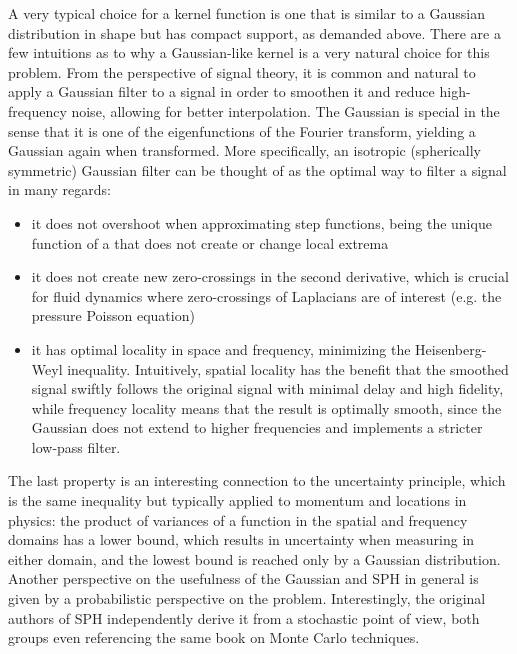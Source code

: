 A very typical choice for a kernel function is one that is similar to a Gaussian distribution in shape but has compact support, as demanded above. There are a few intuitions as to why a Gaussian-like kernel is a very natural choice for this problem. From the perspective of signal theory, it is common\autocite*{gauss-convolution-survey} and natural to apply a Gaussian filter to a signal in order to smoothen it and reduce high-frequency noise, allowing for better interpolation. The Gaussian is special in the sense that it is one of the eigenfunctions of the Fourier transform, yielding a Gaussian again when transformed\autocite*{gauss-eigenfunction}. More specifically, an isotropic (spherically symmetric) Gaussian filter can be thought of as the optimal way to filter a signal in many regards:
\begin{itemize}
  \item it does not overshoot when approximating step functions, being the unique function of a \cite[useful class of functions]{gauss-unique-preserve-local-extrema} that does not create or change local extrema\autocite*{gauss-convolution-survey}
  \item it does not create new zero-crossings in the second derivative\autocite*{gauss-convolution-survey}, which is crucial for fluid dynamics where zero-crossings of Laplacians are of interest (e.g. the pressure Poisson equation)
  \item it has optimal locality in space and frequency, minimizing the Heisenberg-Weyl inequality\autocite*{gauss-convolution-survey}. Intuitively, spatial locality has the benefit that the smoothed signal swiftly follows the original signal with minimal delay and high fidelity, while frequency locality means that the result is optimally smooth, since the Gaussian does not extend to higher frequencies and implements a stricter low-pass filter.
\end{itemize}

The last property is an interesting connection to the uncertainty principle, which is the same inequality but typically applied to momentum and locations in physics: the product of variances of a function in the spatial and frequency domains has a lower bound, which results in uncertainty when measuring in either domain, and the lowest bound is reached only by a Gaussian distribution.\\

Another perspective on the usefulness of the Gaussian and SPH in general is given by a probabilistic perspective on the problem. Interestingly, the original authors of SPH independently derive it from a stochastic point of view\autocite*{sph-lucy-77}\autocite*{sph-monaghan-gingold-77}, both groups even referencing the same book on Monte Carlo techniques\autocite*{hammersley-monte-carlo}.


